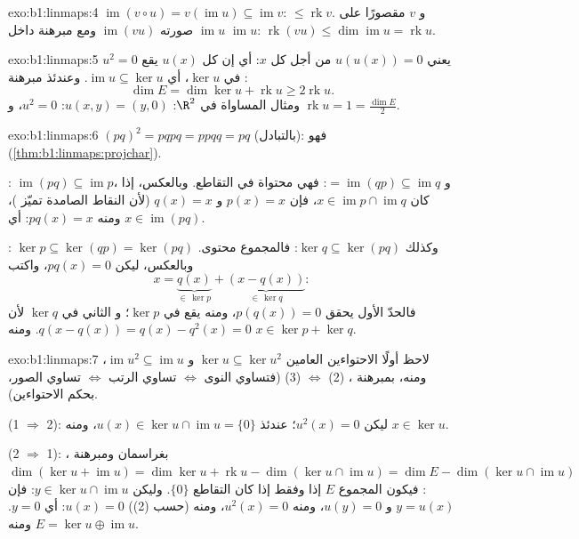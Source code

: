 \begin{solution}{exo:b1:linmaps:4}
$\operatorname{im}(v \circ u) = v(\operatorname{im} u) \subseteq
\operatorname{im} v$:  $\leq \operatorname{rk} v$. و $v$
مقصورًا على $\operatorname{im} u$ صورته
$\operatorname{im}(vu)$ ومع مبرهنة  داخل
$\operatorname{im} u$: $\operatorname{rk}(vu) \leq
\dim\operatorname{im} u = \operatorname{rk} u$.
\end{solution}

\begin{solution}{exo:b1:linmaps:5}
$u^2 = 0$ يعني $u(u(x)) = 0$ من أجل كل $x$: أي إن كل $u(x)$ يقع في
$\ker u$، أي $\operatorname{im} u \subseteq \ker u$. وعندئذ
مبرهنة :
\[
\dim E = \dim\ker u + \operatorname{rk} u \geq 2\operatorname{rk} u .
\]
ومثال المساواة في $\R^2$: $u(x, y) = (y, 0)$: $u^2 = 0$، و
$\operatorname{rk} u = 1 = \frac{\dim E}{2}$.
\end{solution}

\begin{solution}{exo:b1:linmaps:6}
$(pq)^2 = pqpq = ppqq = pq$ (بالتبادل): فهو 
(\cref{thm:b1:linmaps:projchar}).

: $\operatorname{im}(pq) \subseteq \operatorname{im} p$، و
$= \operatorname{im}(qp) \subseteq \operatorname{im} q$: فهي محتواة
في التقاطع. وبالعكس، إذا كان $x \in \operatorname{im} p \cap
\operatorname{im} q$، فإن $p(x) = x$ و $q(x) = x$ (لأن النقاط الصامدة
تميّز  )، ومنه $pq(x) = x$: أي $x \in
\operatorname{im}(pq)$.

: $\ker p \subseteq \ker(qp) = \ker(pq)$ وكذلك $\ker q
\subseteq \ker(pq)$: فالمجموع محتوى. وبالعكس، ليكن $pq(x) =
0$، واكتب
\[
x = \underbrace{q(x)}_{\in\, \ker p} +
\underbrace{(x - q(x))}_{\in\, \ker q} :
\]
فالحدّ الأول يحقق $p(q(x)) = 0$، ومنه يقع في $\ker p$؛ و
الثاني في $\ker q$ لأن $q(x - q(x)) = q(x) - q^2(x) = 0$. ومنه
$x \in \ker p + \ker q$.
\end{solution}

\begin{solution}{exo:b1:linmaps:7}
لاحظ أولًا الاحتواءين العامين $\ker u \subseteq \ker u^2$ و
$\operatorname{im} u^2 \subseteq \operatorname{im} u$، ومنه، بمبرهنة
، (2) $\iff$ (3) (فتساوي النوى $\iff$ تساوي الرتب
$\iff$ تساوي الصور، بحكم الاحتواءين).

(1 $\Rightarrow$ 2): ليكن $u^2(x) = 0$؛ عندئذ $u(x) \in \ker u \cap
\operatorname{im} u = \{0\}$، ومنه $x \in \ker u$.

(2 $\Rightarrow$ 1): بغراسمان ومبرهنة ، $\dim(\ker u +
\operatorname{im} u) = \dim\ker u + \operatorname{rk} u -
\dim(\ker u \cap \operatorname{im} u) = \dim E - \dim(\ker u \cap
\operatorname{im} u)$: فيكون المجموع $E$ إذا وفقط إذا كان التقاطع
$\{0\}$. وليكن $y \in \ker u \cap \operatorname{im} u$: فإن $y = u(x)$ و
$u(y) = 0$، ومنه $u^2(x) = 0$، ومنه (حسب (2)) $u(x) = 0$: أي $y = 0$. ومنه
$E = \ker u \oplus \operatorname{im} u$.
\end{solution}

